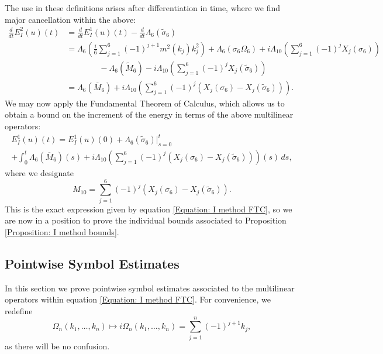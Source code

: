 \documentclass[12pt, letterpaper]{amsart}
\begin{document}
The use in these definitions arises after differentiation in time, where we find major cancellation within the above:
\begin{align*}
\frac{d}{dt}E^2_I(u)(t) &= \frac{d}{dt}E^1_I(u)(t) - \frac{d}{dt}\Lambda_6(\tilde{\sigma}_6)\\
&=\Lambda_6\left(\frac{i}{6}\sum_{j=1}^6(-1)^{j+1}m^2(k_j)k_j^2\right) + \Lambda_6(\sigma_6\Omega_6) + i\Lambda_{10}\left(\sum_{j=1}^6(-1)^{j}X_j(\sigma_6)\right)\\
&\qquad\qquad - \Lambda_6(\tilde{M}_6) - i\Lambda_{10}\left(\sum_{j=1}^6(-1)^jX_j(\tilde{\sigma}_6)\right)\\
&= \Lambda_6(\overline{M}_6)+ i\Lambda_{10}\left(\sum_{j=1}^6(-1)^j(X_j(\sigma_6)-X_j(\tilde{\sigma}_6))\right).
\end{align*}
We may now apply the Fundamental Theorem of Calculus, which allows us to obtain a bound on the increment of the energy in terms of the above multilinear operators:
\begin{multline}
    E^1_I(u)(t) = E^1_I(u)(0) + \Lambda_6(\tilde{\sigma}_6)\big|_{s=0}^t\\
    + \int_0^t \Lambda_6(\overline{M}_6)(s)
    + i\Lambda_{10}\left(\sum_{j=1}^6(-1)^j(X_j(\sigma_6)-X_j(\tilde{\sigma}_6))\right)(s)\,ds,
\end{multline}
where we designate 
\[
M_{10} = \sum_{j=1}^6(-1)^j(X_j(\sigma_6)-X_j(\tilde{\sigma}_6)).
\]
This is the exact expression given by equation \eqref{Equation: I method FTC}, so we are now in a position to prove the individual bounds associated to Proposition \ref{Proposition: I method bounds}.

\subsection{Pointwise Symbol Estimates}\label{Section: Pointwise Symbol Estimates}
In this section we prove pointwise symbol estimates associated to the multilinear operators within equation \eqref{Equation: I method FTC}. For convenience, we redefine 
\[
\Omega_n(k_1,\dots, k_n)\mapsto i\Omega_n(k_1,\dots, k_n) = \sum_{j=1}^n(-1)^{j+1}k_j,
\]
as there will be no confusion.
\end{document}
